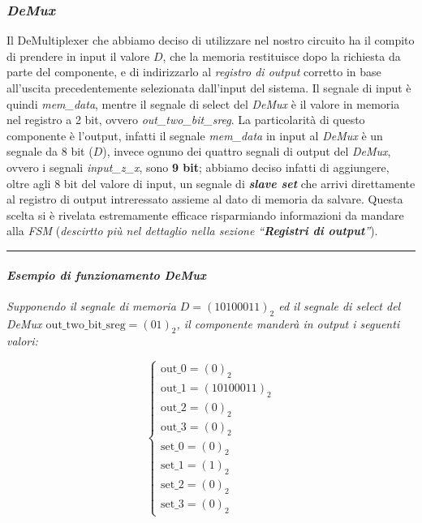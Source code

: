 \hypertarget{demux}{%
\subsubsection{\texorpdfstring{\emph{DeMux}}{DeMux}}\label{demux}}

Il DeMultiplexer che abbiamo deciso di utilizzare nel nostro circuito ha
il compito di prendere in input il valore \(D\), che la memoria
restituisce dopo la richiesta da parte del componente, e di indirizzarlo
al \emph{registro di output} corretto in base all'uscita precedentemente
selezionata dall'input del sistema. Il segnale di input è quindi
\emph{mem\_data}, mentre il segnale di select del \emph{DeMux} è il
valore in memoria nel registro a 2 bit, ovvero
\emph{out\_two\_bit\_sreg}. La particolarità di questo componente è
l'output, infatti il segnale \emph{mem\_data} in input al \emph{DeMux} è
un segnale da 8 bit (\(D\)), invece ognuno dei quattro segnali di output
del \emph{DeMux}, ovvero i segnali \emph{input\_z\_x}, sono \textbf{9
bit}; abbiamo deciso infatti di aggiungere, oltre agli 8 bit del valore
di input, un segnale di \textbf{\emph{slave set}} che arrivi
direttamente al registro di output intreressato assieme al dato di
memoria da salvare. Questa scelta si è rivelata estremamente efficace
risparmiando informazioni da mandare alla \emph{FSM} (\emph{descirtto
più nel dettaglio nella sezione ``\textbf{Registri di output}''}).

\pagebreak

\begin{center}\rule{0.5\linewidth}{0.5pt}\end{center}

\hypertarget{esempio-di-funzionamento-demux}{%
\paragraph{\texorpdfstring{\emph{Esempio di funzionamento
DeMux}}{Esempio di funzionamento DeMux}}\label{esempio-di-funzionamento-demux}}

\emph{Supponendo il segnale di memoria \(D=(10100011)_2\) ed il segnale
di select del DeMux \(\text{out\_two\_bit\_sreg}=(01)_2\), il componente
manderà in output i seguenti valori:}

\[
\begin{cases}\text{out\_0}=(0)_2\\
\text{out\_1}=(10100011)_2\\
\text{out\_2}=(0)_2\\
\text{out\_3}=(0)_2\\
\text{set\_0}=(0)_2\\
\text{set\_1}=(1)_2\\
\text{set\_2}=(0)_2\\
\text{set\_3}=(0)_2\end{cases}
\]

